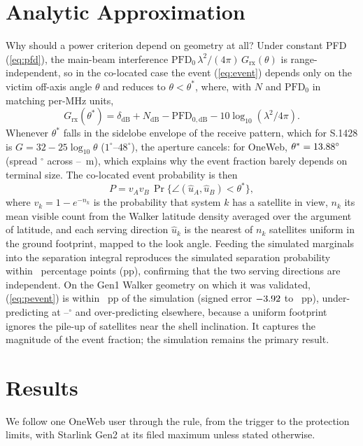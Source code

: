 \documentclass[conference]{IEEEtran}
\begin{document}
\section{Analytic Approximation}
\label{sec:analytic}
Why should a power criterion depend on geometry at all? Under constant PFD
(\ref{eq:pfd}), the main-beam interference
$\mathrm{PFD}_0\,\lambda^2/(4\pi)\,G_{\text{rx}}(\theta)$ is range-independent,
so in the co-located case the event (\ref{eq:event}) depends only on the victim
off-axis angle $\theta$ and reduces to $\theta < \theta^{*}$, where, with $N$
and $\mathrm{PFD}_0$ in matching per-MHz units,
\begin{equation}
G_{\text{rx}}(\theta^{*}) = \delta_{\text{dB}} + N_{\text{dB}} -
\mathrm{PFD}_{0,\text{dB}} - 10\log_{10}(\lambda^2/4\pi).
\label{eq:thetastar}
\end{equation}
Whenever $\theta^{*}$ falls in the sidelobe envelope of the receive pattern, which
for S.1428 is $G = 32 - 25\log_{10}\theta$ ($1^\circ$--$48^\circ$), the aperture
cancels: for OneWeb, $\theta^{*} = 13.88^\circ$ (spread
\AnalyticThetaSpreadDeg$^\circ$ across \EirpHeadDiam--\AperMaxM~m), which explains
why the event fraction barely depends on terminal size. The co-located event
probability is then
\begin{equation}
P = v_A v_B\,\Pr\{\angle(\hat u_A,\hat u_B) < \theta^{*}\},
\label{eq:pevent}
\end{equation}
where $v_k = 1 - e^{-n_k}$ is the probability that system $k$ has a satellite in
view, $n_k$ its mean visible count from the Walker latitude density averaged over
the argument of latitude, and each serving direction $\hat u_k$ is the nearest of
$n_k$ satellites uniform in the ground footprint, mapped to the look angle.
Feeding the simulated marginals into the separation integral reproduces the
simulated separation probability within \DiagnosisIndepMaxErrPct\ percentage
points (pp), confirming that the two serving directions are independent. On the
Gen1 Walker geometry on which it was validated, (\ref{eq:pevent}) is within
\AnalyticMaxAbsErrPct~pp of the simulation (signed error $-3.92$
to \AnalyticSignedMaxPct~pp), under-predicting at
\AnalyticUnderLatLo--\AnalyticUnderLatHi$^\circ$ and over-predicting elsewhere,
because a uniform footprint ignores the pile-up of satellites near the shell
inclination. It captures the magnitude of the event fraction; the simulation
remains the primary result.

\section{Results}
\label{sec:results}
We follow one OneWeb user through the rule, from the trigger to the protection
limits, with Starlink Gen2 at its filed maximum unless stated otherwise.
\end{document}

